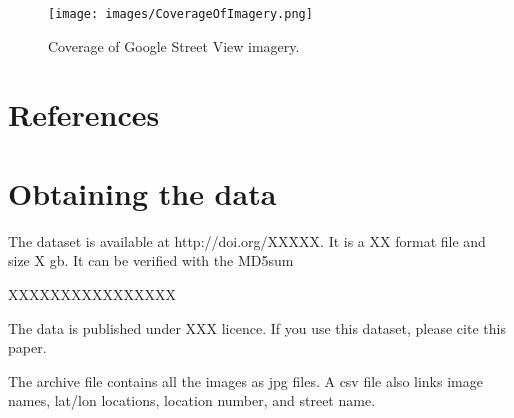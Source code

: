 \documentclass[final,3p,times,authoryear]{elsarticle}
\begin{document}
\begin{figure}[!htbp]
\texttt{[image: images/CoverageOfImagery.png]} 
\caption{Coverage of Google Street View imagery.}    
 \label{fig:coverage}  
\end{figure} 




\section*{References}\label{sec:ref}
   
  


\begin{thebibliography}{00}


\bibitem[ ()]{}

\end{thebibliography}


\appendix
\setcounter{table}{0}
\renewcommand{\thetable}{A\arabic{table}}

\section{Obtaining the data}                           
The dataset is available at http://doi.org/XXXXX. It is a XX format file and size X gb. It can be verified with the MD5sum

XXXXXXXXXXXXXXXX

The data is published under XXX licence. If you use this dataset, please cite this paper.

The archive file contains all the images as jpg files. A csv file also links image names, lat/lon locations, location number, and street name.
\end{document}
